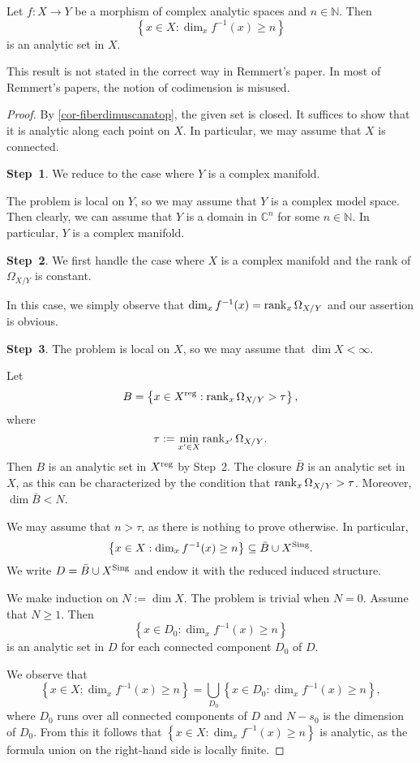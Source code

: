 \begin{corollary}[Remmert]\label{cor-fiberdimusczar}
    Let $f:X\rightarrow Y$ be a morphism of complex analytic spaces and $n\in \mathbb{N}$. 
    Then 
    \[
        \left\{ x\in X: \dim_x f^{-1}(x)\geq n \right\}  
    \]
    is an analytic set in $X$.
\end{corollary}
This result is not stated in the correct way in Remmert's paper. In most of Remmert's papers, the notion of codimension is misused.
\begin{proof}
    By \cref{cor-fiberdimuscanatop}, the given set is closed. It suffices to show that it is analytic along each point on $X$. In particular, we may assume that $X$ is connected.

    \textbf{Step~1}. We reduce to the case where $Y$ is a complex manifold.
    
    The problem is local on $Y$, so we may assume that  $Y$ is a complex model space. Then clearly, we can assume that $Y$ is a domain in $\mathbb{C}^n$ for some $n\in \mathbb{N}$. In particular, $Y$ is a complex manifold.


    \textbf{Step~2}. We first handle the case where $X$ is a complex manifold and the rank of $\Omega_{X/Y}$ is constant.

    In this case, we simply observe that $\dim_x f^{-1}(x)=\rank_x \Omega_{X/Y}$ and our assertion is obvious.

    \textbf{Step~3}. The problem is local on $X$, so we may assume that $\dim X<\infty$.

    Let 
    \[
        B=\left\{x\in X^{\operatorname{reg}}: \rank_x \Omega_{X/Y}>\tau \right\},  
    \]
    where 
    \[
        \tau:=  \min_{x'\in X}\rank_{x'} \Omega_{X/Y}.
    \]
    Then $B$ is an analytic set in $X^{\operatorname{reg}}$ by Step~2. The closure $\bar{B}$ is an analytic set in $X$, as this can be characterized by the condition that $\rank_x \Omega_{X/Y}>\tau$.
    Moreover, $\dim \bar{B}<N$. 
    
    We may assume that $n>\tau$, as there is nothing to prove otherwise. In particular,
    \[
        \left\{ x\in X: \dim_x f^{-1}(x)\geq n \right\}\subseteq \bar{B}\cup X^{\operatorname{Sing}}.  
    \]
    We write $D=\bar{B}\cup X^{\operatorname{Sing}}$ and endow it with the reduced induced structure.

    We make induction on $N:=\dim X$. The problem is trivial when $N=0$. Assume that $N\geq 1$. Then
    \[
        \left\{ x\in D_0: \dim_x f^{-1}(x)\geq n \right\}  
    \]
    is an analytic set in $D$ for each connected component $D_0$ of $D$.

    We observe that
    \[
        \left\{ x\in X: \dim_x f^{-1}(x)\geq n \right\}=\bigcup_{D_0} \left\{ x\in D_0: \dim_x f^{-1}(x)\geq n \right\},
    \]
    where $D_0$ runs over all connected components of $D$ and $N-s_0$ is the dimension of $D_0$. From this it follows that $\left\{ x\in X: \dim_x f^{-1}(x)\geq n \right\}$ is analytic, as the formula union on the right-hand side is locally finite.
\end{proof}
